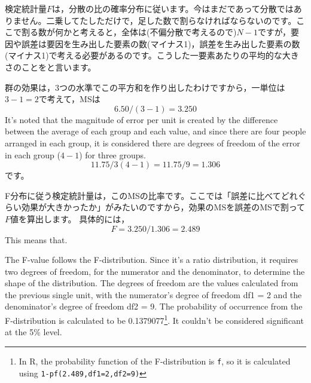 \documentclass{ltjbook}
\begin{document}
検定統計量$F$は，分散の比の確率分布に従います。今はまだであって分散ではありません。二乗してたしただけで，足した数で割らなければならないのです。ここで割る数が何かと考えると，全体は(不偏分散で考えるので)$N-1$ですが，要因や誤差は要因を生み出した要素の数(マイナス1)，誤差を生み出した要素の数(マイナス1)で考える必要があるのです。こうした一要素あたりの平均的な大きさのことをと言います。

群の効果は，3つの水準でこの平方和を作り出したわけですから，一単位は$3-1=2$で考えて，MSは
\[ 6.50 / (3-1) = 3.250\]
It's noted that the magnitude of error per unit is created by the difference between the average of each group and each value, and since there are four people arranged in each group, it is considered there are degrees of freedom of the error in each group ($4-1$) for three groups.
\[ 11.75/3(4-1)=11.75/9 = 1.306\]
です。

F分布に従う検定統計量は，このMSの比率です。ここでは「誤差に比べてどれぐらい効果が大きかったか」がみたいのですから，効果のMSを誤差のMSで割って$F$値を算出します。
具体的には，
\[F = 3.250/1.306 = 2.489\]
This means that.

The F-value follows the F-distribution. Since it's a ratio distribution, it requires two degrees of freedom, for the numerator and the denominator, to determine the shape of the distribution. The degrees of freedom are the values calculated from the previous single unit, with the numerator's degree of freedom df1 = 2 and the denominator's degree of freedom df2 = 9. The probability of occurrence from the F-distribution is calculated to be 0.1379077\footnote{In R, the probability function of the F-distribution is \texttt{f}, so it is calculated using \texttt{1-pf(2.489,df1=2,df2=9)}}. It couldn't be considered significant at the 5\% level.
\end{document}
